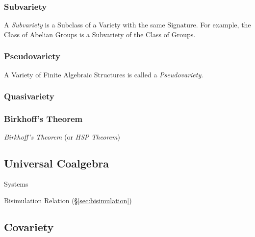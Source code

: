 \subsubsection{Subvariety}\label{sec:subvariety_theorem}

A \emph{Subvariety} is a Subclass of a Variety with the same
Signature. For example, the Class of Abelian Groups is a Subvariety of
the Class of Groups.



\subsubsection{Pseudovariety}\label{sec:pseudovariety}

A Variety of Finite Algebraic Structures is called a
\emph{Pseudovariety}.



\subsubsection{Quasivariety}\label{sec:quasivariety}



\subsubsection{Birkhoff's Theorem}\label{sec:birkhoffs_theorem}
\cite{birkhoff35}

\emph{Birkhoff's Theorem} (or \emph{HSP Theorem})



\subsection{Universal Coalgebra}\label{sec:universal_coalgebra}

\cite{rutten00}

Systems

Bisimulation Relation (\S\ref{sec:bisimulation})



\subsection{Covariety}\label{sec:covariety}

